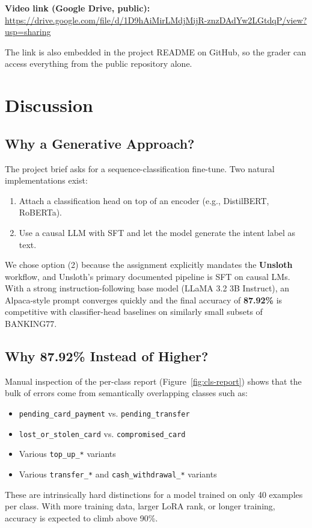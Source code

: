 \documentclass[12pt,a4paper]{article}
\newcommand{\videolink}{\url{https://drive.google.com/file/d/1D9hAiMirLMdjMijR-znzDAdYw2LGtdqP/view?usp=sharing}}
\begin{document}
\textbf{Video link (Google Drive, public):}\\
\videolink{}

The link is also embedded in the project README on GitHub, so the grader can
access everything from the public repository alone.

\section{Discussion}
\label{sec:discussion}

\subsection{Why a Generative Approach?}

The project brief asks for a sequence-classification fine-tune. Two natural
implementations exist:
\begin{enumerate}[noitemsep]
    \item Attach a classification head on top of an encoder
          (e.g., DistilBERT, RoBERTa).
    \item Use a causal LLM with SFT and let the model generate the intent
          label as text.
\end{enumerate}

We chose option (2) because the assignment explicitly mandates the
\textbf{Unsloth} workflow, and Unsloth's primary documented pipeline is
SFT on causal LMs. With a strong instruction-following base model
(LLaMA 3.2 3B Instruct), an Alpaca-style prompt converges quickly and the
final accuracy of \textbf{87.92\%} is competitive with classifier-head
baselines on similarly small subsets of BANKING77.

\subsection{Why 87.92\% Instead of Higher?}

Manual inspection of the per-class report (Figure~\ref{fig:cls-report}) shows
that the bulk of errors come from semantically overlapping classes such as:
\begin{itemize}[noitemsep]
    \item \texttt{pending\_card\_payment} vs. \texttt{pending\_transfer}
    \item \texttt{lost\_or\_stolen\_card} vs. \texttt{compromised\_card}
    \item Various \texttt{top\_up\_*} variants
    \item Various \texttt{transfer\_*} and \texttt{cash\_withdrawal\_*}
          variants
\end{itemize}
These are intrinsically hard distinctions for a model trained on only 40
examples per class. With more training data, larger LoRA rank, or longer
training, accuracy is expected to climb above 90\%.
\end{document}
